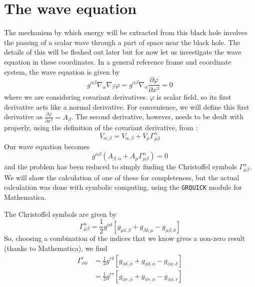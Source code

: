 \documentclass[11pt]{article}
\numberwithin{equation}{section}
\numberwithin{figure}{section}
\numberwithin{table}{section}
\begin{document}
\section{The wave equation}\label{sec:Wave Equation}
\par The mechanism by which energy will be extracted from this black hole involves the passing of a scalar wave through a part of space near the black hole. The details of this will be fleshed out later but for now let us investigate the wave equation in these coordinates. In a general reference frame and coordinate system, the wave equation is given by
\begin{equation}
    g^{\alpha\beta}\nabla_\alpha\nabla_\beta \varphi=g^{\alpha\beta}\nabla_\alpha\frac{\partial \varphi}{\partial x^\beta}=0
    \label{eqn:general wave equation}
\end{equation}
where we are considering covariant derivatives. $\varphi$ is scalar field, so its first derivative acts like a normal derivative. For convenience, we will define this first derivative as $\frac{\partial \varphi}{\partial x^\beta} = A_\beta$. The second derivative, however, needs to be dealt with properly, using the definition of the covariant derivative, from \cite{dunsby}:
\begin{equation}
    V_{\alpha;\beta}=V_{\alpha,\beta}+V_\mu\Gamma^\alpha_{\mu\beta}
    \label{eqn:covariant derivative}
\end{equation}
Our wave equation becomes
\begin{equation*}
    g^{\alpha\beta}\left(A_{\beta,\alpha}+A_\mu\Gamma^\alpha_{\mu\beta}\right)=0
\end{equation*}
and the problem has been reduced to simply finding the Christoffel symbols $\Gamma^\alpha_{\mu\beta}$. We will show the calculation of one of these for completeness, but the actual calculation was done with symbolic computing, using the \texttt{GRQUICK} module for Mathematica.
\par The Christoffel symbols are given by 
\begin{equation}
    \Gamma^\alpha_{\mu\beta}=\frac{1}{2}g^{\alpha\delta}[g_{\mu\delta,\beta}+g_{\beta\delta,\mu}-g_{\mu\beta,\delta}]
    \label{eqn:Christoffel symbol}
\end{equation}
So, choosing a combination of the indices that we know gives a non-zero result (thanks to Mathematica), we find
\begin{align*}
    \Gamma^r_{\phi\phi}&=\frac{1}{2}g^{r\delta}[g_{\phi\delta,\phi}+g_{\phi\delta,\phi}-g_{\phi\phi,\delta}]\\
    &=\frac{1}{2}g^{rr}[g_{\phi r,\phi}+g_{\phi r,\phi}-g_{\phi\phi,r}]
\end{align*}
\end{document}
